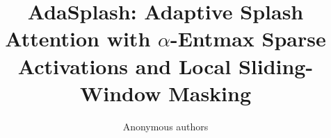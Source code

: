 \title{\textbf{AdaSplash: Adaptive Splash Attention with $\alpha$-Entmax Sparse Activations and Local Sliding-Window Masking}}

\author{Anonymous authors}
